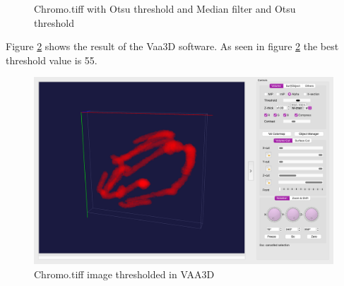 \documentclass{article}
\begin{document}
\begin{figure}%
    \centering
     \label{fig:Otsu}%
    \qquad
    \caption{Chromo.tiff with Otsu threshold and Median filter and Otsu threshold}%
    \label{fig:Otsu}%
\end{figure}

Figure \ref{fig:vaa3dthresh} shows the result of the Vaa3D software. As seen in figure \ref{fig:vaa3dthresh} the best threshold value is 55. 

\begin{figure}[h!]
    \centering
    \includegraphics[width=1\linewidth]{Report/Images/vaa3d_thresh.png}
    \caption{Chromo.tiff image thresholded in VAA3D}
    \label{fig:vaa3dthresh}
\end{figure}
\end{document}
